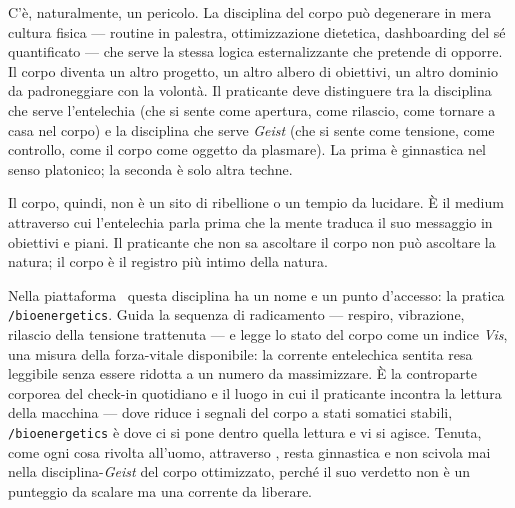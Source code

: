 C'\`e, naturalmente, un pericolo. La disciplina del corpo pu\`o
degenerare in mera cultura fisica --- routine in palestra,
ottimizzazione dietetica, dashboarding del s\'e quantificato --- che
serve la stessa logica esternalizzante che pretende di opporre. Il corpo
diventa un altro progetto, un altro albero di obiettivi, un altro dominio
da padroneggiare con la volont\`a. Il praticante deve distinguere tra
la disciplina che serve l'entelechia (che si sente come apertura, come
rilascio, come tornare a casa nel corpo) e la disciplina che serve
\emph{Geist} (che si sente come tensione, come controllo, come il corpo
come oggetto da plasmare). La prima \`e ginnastica nel senso platonico;
la seconda \`e solo altra techne.

Il corpo, quindi, non \`e un sito di ribellione o un tempio da lucidare.
\`E il medium attraverso cui l'entelechia parla prima che la mente
traduca il suo messaggio in obiettivi e piani. Il praticante che non
sa ascoltare il corpo non pu\`o ascoltare la natura; il corpo \`e il
registro pi\`u intimo della natura.

Nella piattaforma \praxis\ questa disciplina ha un nome e un punto d'accesso: la
pratica \texttt{/bioenergetics}. Guida la sequenza di radicamento --- respiro,
vibrazione, rilascio della tensione trattenuta --- e legge lo stato del corpo come
un indice \emph{Vis}, una misura della forza-vitale disponibile: la corrente
entelechica sentita resa leggibile senza essere ridotta a un numero da
massimizzare. \`E la controparte corporea del check-in quotidiano e il luogo in cui
il praticante incontra la lettura della macchina  --- dove
 riduce i segnali del corpo a stati somatici stabili,
\texttt{/bioenergetics} \`e dove ci si pone dentro quella lettura e vi si agisce.
Tenuta, come ogni cosa rivolta all'uomo, attraverso , resta
ginnastica e non scivola mai nella disciplina-\emph{Geist} del corpo ottimizzato,
perch\'e il suo verdetto non \`e un punteggio da scalare ma una corrente da
liberare.

